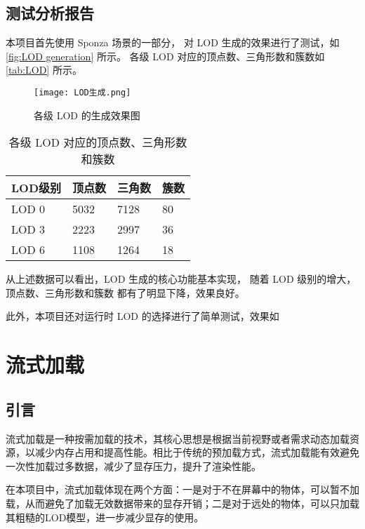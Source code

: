 \subsection{测试分析报告}

本项目首先使用 Sponza 场景的一部分，
对 LOD 生成的效果进行了测试，如\autoref{fig:LOD generation} 所示。
各级 LOD 对应的顶点数、三角形数和簇数如\autoref{tab:LOD} 所示。

\begin{figure}[!htb]
    \centering
    \texttt{[image: LOD生成.png]}
    \caption{\label{fig:LOD generation}各级 LOD 的生成效果图}
\end{figure}

\begin{table}[!htb]
    \caption{\label{tab:LOD}各级 LOD 对应的顶点数、三角形数和簇数}
    \begin{tabularx}{\linewidth}{|X<{\centering}|X<{\centering}|X<{\centering}|X<{\centering}|}
        \hline
        LOD级别 & 顶点数 & 三角数 & 簇数 \\ \hline
        LOD 0 & 5032 & 7128 & 80 \\ \hline
        LOD 3 & 2223 & 2997 & 36 \\ \hline
        LOD 6 & 1108 & 1264 & 18 \\ \hline
    \end{tabularx}
\end{table}

从上述数据可以看出，LOD 生成的核心功能基本实现，
随着 LOD 级别的增大，顶点数、三角形数和簇数
都有了明显下降，效果良好。

此外，本项目还对运行时 LOD 的选择进行了简单测试，效果如


\section{流式加载}

\subsection{引言}

流式加载是一种按需加载的技术，其核心思想是根据当前视野或者需求动态加载资源，以减少内存占用和提高性能。相比于传统的预加载方式，流式加载能有效避免一次性加载过多数据，减少了显存压力，提升了渲染性能。

在本项目中，流式加载体现在两个方面：一是对于不在屏幕中的物体，可以暂不加载，从而避免了加载无效数据带来的显存开销；二是对于远处的物体，可以只加载其粗糙的LOD模型，进一步减少显存的使用。

